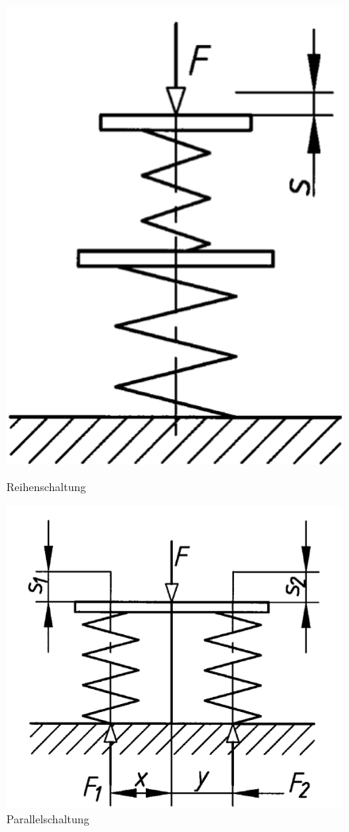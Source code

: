 \begin{figure}[H]
	\centering
	\begin{minipage}[b]{0.30\linewidth}
		\includegraphics[width=\linewidth]{federn/reihenschaltung}
		\vspace{3.6mm}
		\caption*{Reihenschaltung}
	\end{minipage}
	\begin{minipage}[b]{0.43\linewidth}
		\includegraphics[width=\linewidth]{federn/parallelschaltung}
		\caption*{Parallelschaltung}
	\end{minipage}
\end{figure}


